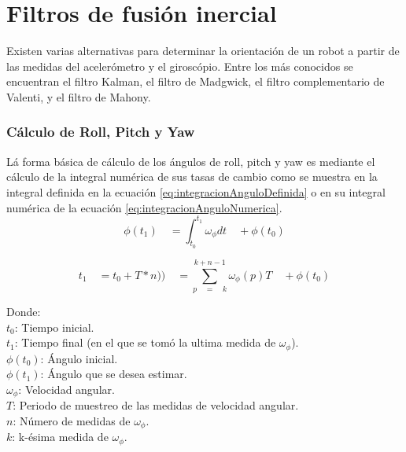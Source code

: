 \section{ Filtros de fusión inercial }

Existen varias alternativas para determinar la orientación de un robot a partir de las medidas del acelerómetro y el giroscópio. Entre los más conocidos se encuentran el filtro Kalman, el filtro de Madgwick, el filtro complementario de Valenti, y el filtro de Mahony.

\subsubsection{Cálculo de Roll, Pitch y Yaw}
Lá forma básica de cálculo de los ángulos de roll, pitch y yaw es mediante el cálculo de la integral numérica de sus tasas de cambio como se muestra en
la integral definida en la ecuación 
\ref{eq:integracionAnguloDefinida} o en su integral numérica de la ecuación \ref{eq:integracionAnguloNumerica}.\\

\begin{equation} \label{eq:integracionAnguloDefinida}
\phi ({ t }_{ 1 })\quad =\int _{ { t }_{ 0 } }^{ { t }_{ 1 } }{ { \omega  }_{ \phi  }dt } \quad +\phi ({ t }_{ 0 })
\end{equation}

\begin{equation} \label{eq:integracionAnguloNumerica}
{ t }_{ 1 }\quad ={ { t }_{ 0 }+T*n) })\quad =\sum _{ p\quad =\quad k }^{ k+n-1 }{ \omega _{ \phi  }(p)T } \quad +\phi ({ t }_{ 0 })
\end{equation}

Donde:\\
$t_0 $: Tiempo inicial.\\
$t_1 $: Tiempo final (en el que se tomó la ultima medida de $\omega _{ \phi  }$).\\
$\phi ({ t }_{ 0 })$: Ángulo inicial.\\
$\phi ({ t }_{ 1 })$: Ángulo que se desea estimar.\\
$\omega _{ \phi  }$: Velocidad angular.\\
$T$: Periodo de muestreo de las medidas de velocidad angular.\\
$n$: Número de medidas de $\omega _{ \phi  }$.\\
$k$: k-ésima medida de $\omega _{ \phi  }$. \\


